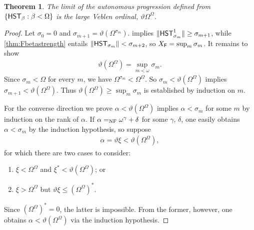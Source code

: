 \documentclass[UKenglish,cleveref,DIV=12]{scrartcl}
\newtheorem{theorem}{Theorem}
\theoremstyle{definition}
\theoremstyle{definition}
\begin{document}
\begin{theorem}\label{thm:Fbauto}
 The limit of the autonomous progression defined from $\{\mathsf{HST}_\beta:\beta<\Omega\}$ is the large Veblen ordinal, $\vartheta\Omega^\Omega$.
\end{theorem}
\begin{proof}
Let $\sigma_0=0$ and $\sigma_{m+1}=\vartheta(\Omega^{\sigma_m})$.  implies $\lVert{\mathsf{HST}_{\sigma_m}^1}\rVert\ge\sigma_{m+1}$, while \cref{thm:Fbetastrength} entails $\lVert{\mathsf{HST}_{\sigma_m}}\rVert<\sigma_{m+2}$, so $X_{\mathsf{F}}=\sup_m\sigma_m$. It remains to show
\begin{align*}
 \vartheta(\Omega^\Omega)=\sup_{m<\omega}\sigma_m.
\end{align*}
Since ${\sigma_m}<\Omega$ for every $m$, we have $\Omega^{\sigma_m}<\Omega^\Omega$.
So $\sigma_m<\vartheta(\Omega^\Omega)$ implies
$\sigma_{m+1}<\vartheta(\Omega^\Omega)$. Thus
$\vartheta(\Omega^\Omega)\ge\sup_m\sigma_m$ is established by induction on $m$.

For the converse direction we prove $\alpha<\vartheta(\Omega^\Omega)$ implies
$\alpha<\sigma_m$ for some $m$ by induction on the rank of $\alpha$. If
$\alpha=_{\mathrm{NF}}\omega^\gamma+\delta$ for some $\gamma$, $\delta$, one easily obtains
$\alpha<\sigma_m$ by the induction hypothesis, so suppose
\begin{align*}
 \alpha=\vartheta\xi<\vartheta(\Omega^\Omega),
\end{align*}
for which there are two cases to consider:
\begin{enumerate}
 \item $\xi<\Omega^\Omega$ and $\xi^*<\vartheta(\Omega^\Omega)$; or
 \item $\xi>\Omega^\Omega$ but $\vartheta\xi\le(\Omega^\Omega)^*$.
\end{enumerate}
Since $(\Omega^\Omega)^*=0$, the latter is impossible. From the former, however, one obtains $\alpha<\vartheta(\Omega^\Omega)$ via the induction
hypothesis.
\end{proof}
\end{document}
